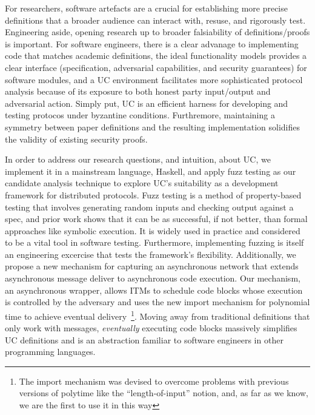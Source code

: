 For researchers, software artefacts are a crucial for establishing more precise definitions that a broader audience can interact with, resuse, and rigorously test. 
Engineering aside, opening research up to broader falsiability of definitions/proofs is important.
For software engineers, there is a clear advanage to implementing code that matches academic definitions, the ideal functionality models provides a clear interface (specification, adversarial capabilities, and security guarantees) for software modules, and a UC environment facilitates more sophisticated protocol analysis because of its exposure to both honest party input/output and adversarial action.
Simply put, UC is an efficient  harness for developing and testing protocos under byzantine conditions.
Furthremore, maintaining a symmetry between paper definitions and the resulting implementation solidifies the validity of existing security proofs.

In order to address our research questions, and intuition, about UC, we implement it in a mainstream language, Haskell, and apply fuzz testing as our candidate analysis technique to explore UC's suitability as a development framework for distributed protocols.
Fuzz testing is a method of property-based testing that involves generating random inputs and checking output against a spec, and prior work shows that it can be as successful, if not better, than formal approaches like symbolic execution. 
It is widely used in practice and considered to be a vital tool in software testing.
Furthermore, implementing fuzzing is itself an engineering excercise that tests the framework's flexibility. 
Additionally, we propose a new mechanism for capturing an asynchronous network that extends asynchronous message deliver to asynchronous code execution. 
Our mechanism, an asynchronous wrapper, allows ITMs to schedule code blocks whose execution is controlled by the adversary and uses the new import mechanism for polynomial time to achieve eventual delivery~\footnote{The import mechanism was devised to overcome problems with previous versions of polytime like the ``length-of-input'' notion, and, as far as we know, we are the first to use it in this way}.
Moving away from traditional definitions that only work with messages, \emph{eventually} executing code blocks massively simplifies UC definitions and is an abstraction familiar to software engineers in other programming languages.



